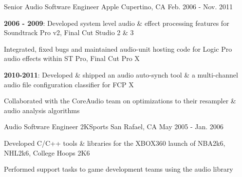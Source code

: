 \begin{cventries}
  \cventry
    {Senior Audio Software Engineer} %
    {Apple} %
    {Cupertino, CA} %
    {Feb. 2006 - Nov. 2011} %
    {
      \begin{cvitems} %
        \item {\textbf{2006 - 2009}: Developed system level audio \& effect processing features for Soundtrack Pro v2, Final Cut Studio 2 \& 3} 
        \item {Integrated, fixed bugs and maintained audio-unit hosting code for Logic Pro audio effects within ST Pro, Final Cut Pro X}
        \item {\textbf{2010-2011}: Developed \& shipped an audio auto-synch tool \& a multi-channel audio file configuration classifier for FCP X}        
		\item {Collaborated with the CoreAudio team on optimizations to their resampler \& audio analysis algorithms}
      \end{cvitems}
    }

  \cventry
    {Audio Software Engineer} %
    {2KSports} %
    {San Rafael, CA} %
    {May 2005 - Jan. 2006} %
    {
      \begin{cvitems} %
        \item {Developed C/C++ tools \& libraries for the XBOX360 launch of NBA2k6, NHL2k6, College Hoops 2K6}
        \item {Performed support tasks to game development teams using the audio library}
      \end{cvitems}
    }

\end{cventries}
	
